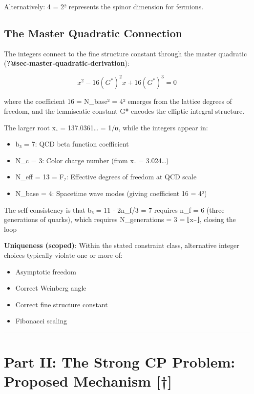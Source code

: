 \documentclass[
  11pt,
  letterpaper,
  twoside,
  openany]{book}
\makeatletter
\providecommand{\tightlist}{%
  \setlength{\itemsep}{0pt}\setlength{\parskip}{0pt}}
\let\orig@section\section
\renewcommand{\section}{\needspace{8\baselineskip}\orig@section}
\let\orig@subsection\subsection
\renewcommand{\subsection}{\needspace{6\baselineskip}\orig@subsection}
\makeatother
\begin{document}
Alternatively: 4 = 2² represents the spinor dimension for fermions.

\subsection{The Master Quadratic
Connection}\label{the-master-quadratic-connection}

The integers connect to the fine structure constant through the master
quadratic (\textbf{?@sec-master-quadratic-derivation}):

\[x^2 - 16(G^*)^2 x + 16(G^*)^3 = 0\]

where the coefficient 16 = N\_base² = 4² emerges from the lattice
degrees of freedom, and the lemniscatic constant G* encodes the elliptic
integral structure.

The larger root x₊ = 137.0361\ldots{} = 1/α, while the integers appear
in:

\begin{itemize}
\tightlist
\item
  b₃ = 7: QCD beta function coefficient
\item
  N\_c = 3: Color charge number (from x₋ = 3.024\ldots)
\item
  N\_eff = 13 = F₇: Effective degrees of freedom at QCD scale
\item
  N\_base = 4: Spacetime wave modes (giving coefficient 16 = 4²)
\end{itemize}

The self-consistency is that b₃ = 11 - 2n\_f/3 = 7 requires n\_f = 6
(three generations of quarks), which requires N\_generations = 3 = ⌊x₋⌋,
closing the loop

\textbf{Uniqueness (scoped)}: Within the stated constraint class,
alternative integer choices typically violate one or more of:

\begin{itemize}
\tightlist
\item
  Asymptotic freedom
\item
  Correct Weinberg angle
\item
  Correct fine structure constant
\item
  Fibonacci scaling
\end{itemize}

\begin{center}\rule{0.5\linewidth}{0.5pt}\end{center}

\section{Part II: The Strong CP Problem: Proposed Mechanism
{[}†{]}}\label{part-ii-the-strong-cp-problem-proposed-mechanism}
\end{document}
